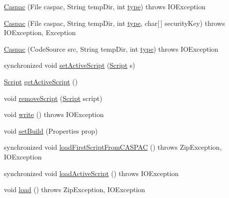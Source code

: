 \begin{DoxyCompactItemize}
\item 
\hyperlink{class_c_a_s_u_a_l_1_1caspac_1_1_caspac_ab38e5cbb99b6d16f213340e9e61e74be}{Caspac} (File caspac, String temp\-Dir, int \hyperlink{class_c_a_s_u_a_l_1_1caspac_1_1_caspac_a1fa7fccdf284c0b71c45004978d8c7d4}{type})  throws I\-O\-Exception 
\item 
\hyperlink{class_c_a_s_u_a_l_1_1caspac_1_1_caspac_a5e48084a2dab585c35cbbfaa4fa9d930}{Caspac} (File caspac, String temp\-Dir, int \hyperlink{class_c_a_s_u_a_l_1_1caspac_1_1_caspac_a1fa7fccdf284c0b71c45004978d8c7d4}{type}, char\mbox{[}$\,$\mbox{]} security\-Key)  throws I\-O\-Exception, Exception 
\item 
\hyperlink{class_c_a_s_u_a_l_1_1caspac_1_1_caspac_add729e52bae97e76abb6274c966d0cef}{Caspac} (Code\-Source src, String temp\-Dir, int \hyperlink{class_c_a_s_u_a_l_1_1caspac_1_1_caspac_a1fa7fccdf284c0b71c45004978d8c7d4}{type})  throws I\-O\-Exception 
\item 
synchronized void \hyperlink{class_c_a_s_u_a_l_1_1caspac_1_1_caspac_ad9977d679506d5819d18281b4e2c6c19}{set\-Active\-Script} (\hyperlink{class_c_a_s_u_a_l_1_1caspac_1_1_script}{Script} s)
\item 
\hyperlink{class_c_a_s_u_a_l_1_1caspac_1_1_script}{Script} \hyperlink{class_c_a_s_u_a_l_1_1caspac_1_1_caspac_acb6c1d1e3d6d4e69930a0eeba2be3326}{get\-Active\-Script} ()
\item 
void \hyperlink{class_c_a_s_u_a_l_1_1caspac_1_1_caspac_a6368289098354e4d854ed665eb956dbe}{remove\-Script} (\hyperlink{class_c_a_s_u_a_l_1_1caspac_1_1_script}{Script} script)
\item 
void \hyperlink{class_c_a_s_u_a_l_1_1caspac_1_1_caspac_a872aa569a507a588786ad590b1a66d3b}{write} ()  throws I\-O\-Exception 
\item 
void \hyperlink{class_c_a_s_u_a_l_1_1caspac_1_1_caspac_a9bbcc820fc5af56dd7e2a45908db30e6}{set\-Build} (Properties prop)
\item 
synchronized void \hyperlink{class_c_a_s_u_a_l_1_1caspac_1_1_caspac_a22fd32e7eb1a0a589eb0ed54c64f1a4b}{load\-First\-Script\-From\-C\-A\-S\-P\-A\-C} ()  throws Zip\-Exception, I\-O\-Exception 
\item 
synchronized void \hyperlink{class_c_a_s_u_a_l_1_1caspac_1_1_caspac_a5aab5060f3557b221f898fbc775690aa}{load\-Active\-Script} ()  throws I\-O\-Exception 
\item 
void \hyperlink{class_c_a_s_u_a_l_1_1caspac_1_1_caspac_a8dde0efbfc89cc5eba2a76bc29b2cd93}{load} ()  throws Zip\-Exception, I\-O\-Exception 
\item 

\end{DoxyCompactItemize}
